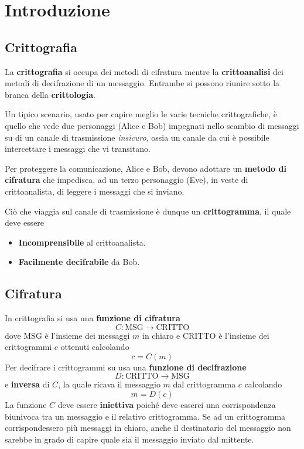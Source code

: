 \chapter{Introduzione}\label{intro}
\section{Crittografia}\label{crittografia}
La \textbf{crittografia} si occupa dei metodi di cifratura mentre la \textbf{crittoanalisi} dei metodi di decifrazione
di un messaggio. Entrambe si possono riunire sotto la branca della \textbf{crittologia}.

Un tipico scenario, usato per capire meglio le varie tecniche crittografiche, \`e quello che vede due personaggi (Alice
e Bob) impegnati nello scambio di messaggi su di un canale di trasmissione \emph{insicuro}, ossia un canale da cui \`e
possibile intercettare i messaggi che vi transitano.

Per proteggere la comunicazione, Alice e Bob, devono adottare un \textbf{metodo di cifratura} che impedisca, ad un terzo
personaggio (Eve), in veste di crittoanalista, di leggere i messaggi che si inviano.

Ci\`o che viaggia sul canale di trasmissione \`e dunque un \textbf{crittogramma}, il quale deve essere
\begin{itemize}
	\item \textbf{Incomprensibile} al crittoanalista.
	\item \textbf{Facilmente decifrabile} da Bob.
\end{itemize}

\section{Cifratura}\label{cifratura}
In crittografia si usa una \textbf{funzione di cifratura}
\[ C : \text{MSG} \rightarrow \text{CRITTO} \]
dove MSG \`e l'insieme dei messaggi $m$ in chiaro e CRITTO \`e l'insieme dei crittogrammi $c$ ottenuti calcolando
\[ c = C(m) \]
Per decifrare i crittogrammi su usa una \textbf{funzione di decifrazione}
\[ D : \text{CRITTO} \rightarrow \text{MSG} \]
e \textbf{inversa} di $C$, la quale ricava il messaggio $m$ dal crittogramma $c$ calcolando
\[ m = D(c) \]
La funzione $C$ deve essere \textbf{iniettiva} poich\'e deve esserci una corrispondenza biunivoca tra un messaggio e
il relativo crittogramma. Se ad un crittogramma corrispondessero pi\`u messaggi in chiaro, anche il destinatario del
messaggio non sarebbe in grado di capire quale sia il messaggio inviato dal mittente.

